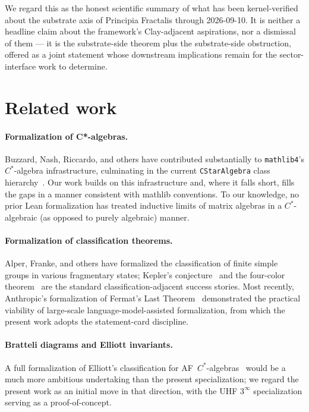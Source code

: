 \documentclass[11pt,a4paper]{article}
\theoremstyle{plain}
\theoremstyle{definition}
\begin{document}
We regard this as the honest scientific summary of what has been kernel-verified about the substrate axis of Principia Fractalis through 2026-09-10. It is neither a headline claim about the framework's Clay-adjacent aspirations, nor a dismissal of them --- it is the substrate-side theorem plus the substrate-side obstruction, offered as a joint statement whose downstream implications remain for the sector-interface work to determine.

\section{Related work}
\label{sec:related}

\paragraph{Formalization of C*-algebras.} Buzzard, Nash, Riccardo, and others have contributed substantially to \texttt{mathlib4}'s $C^{\ast}$-algebra infrastructure, culminating in the current \texttt{CStarAlgebra} class hierarchy~\cite{mathlib_cstar_2026}. Our work builds on this infrastructure and, where it falls short, fills the gaps in a manner consistent with mathlib conventions. To our knowledge, no prior Lean formalization has treated inductive limits of matrix algebras in a $C^{\ast}$-algebraic (as opposed to purely algebraic) manner.

\paragraph{Formalization of classification theorems.} Alper, Franke, and others have formalized the classification of finite simple groups in various fragmentary states; Kepler's conjecture~\cite{hales_kepler_formal_2017} and the four-color theorem~\cite{gonthier_4color_2008} are the standard classification-adjacent success stories. Most recently, Anthropic's formalization of Fermat's Last Theorem~\cite{anthropic_flt_2026} demonstrated the practical viability of large-scale language-model-assisted formalization, from which the present work adopts the statement-card discipline.

\paragraph{Bratteli diagrams and Elliott invariants.} A full formalization of Elliott's classification for AF~$C^{\ast}$-algebras~\cite{elliott1976} would be a much more ambitious undertaking than the present specialization; we regard the present work as an initial move in that direction, with the UHF $3^{\infty}$ specialization serving as a proof-of-concept.
\end{document}
